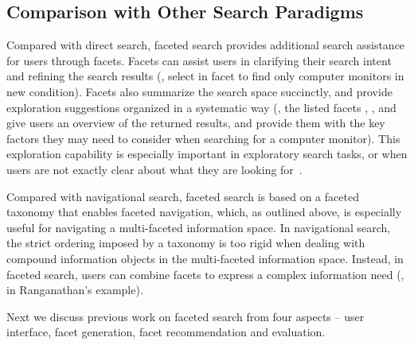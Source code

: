 
\subsection{Comparison with Other Search Paradigms}
Compared with direct search, faceted search provides additional search assistance for users through facets. Facets can assist users in clarifying their search intent and refining the search results (\eg, select  in facet  to find only computer monitors in new condition). Facets also summarize the search space succinctly, and provide exploration suggestions organized in a systematic way (\eg, the listed facets , , and  give users an overview of the returned results, and provide them with the key factors they may need to consider when searching for a computer monitor). This exploration capability is especially important in exploratory search tasks, or when users are not exactly clear about what they are looking for~\cite{kules2009exploratory,sacco2009dynamic}. 

Compared with navigational search, faceted search is based on a faceted taxonomy that enables faceted navigation, which, as outlined above, is especially useful for navigating a multi-faceted information space. In navigational search, the strict ordering imposed by a taxonomy is too rigid when dealing with compound information objects in the multi-faceted information space. Instead, in faceted search, users can combine facets to express a complex information need (\eg,  in  Ranganathan's example).

Next we discuss previous work on faceted search from four aspects -- user interface, facet generation, facet recommendation and evaluation.

